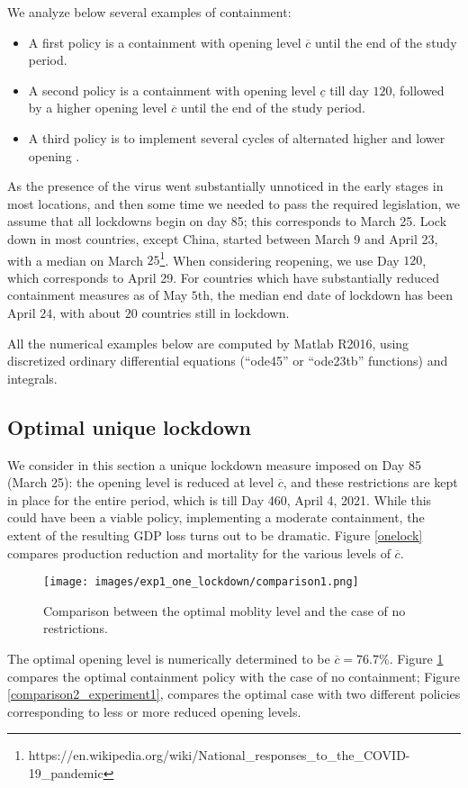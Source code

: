 \documentclass{amsart}
\begin{document}
We analyze below several examples of containment:
 \begin{itemize}
 \item A first policy is a containment with opening level 
 $\overline c$ until the end of the study period.
 \item A second policy is a containment  with opening level  $\underline c$
 till day $120$,  followed by a higher opening level 
 $\overline c$ until the end of the study period.
 \item A third policy is to implement several cycles of alternated higher and lower opening .
 \end{itemize}
 

As the presence of the virus went substantially unnoticed
in the early stages in most locations, and then some
time we needed to pass the required legislation,
we 
assume that all lockdowns begin on day 85; this
corresponds to March 25. Lock down in most countries,
except China,
started between March 9 and April 23, with a median
on March $25$\footnote{https://en.wikipedia.org/wiki/National\_responses\_to\_the\_COVID-19\_pandemic}.
When considering reopening, we use Day $120$,
which corresponds to 
April 29. For countries which have substantially reduced
containment measures as of May $5$th, the median
end date of lockdown has been April $24$, with about $20$
countries still in lockdown.

All the numerical examples below are computed by Matlab R2016, using   discretized ordinary differential equations (``ode45'' or ``ode23tb'' functions) and integrals. 


\subsection{Optimal unique lockdown} \label{SectUniqLock}
We consider in this section a unique lockdown measure
imposed on Day 85 (March 25):
the opening level is reduced at level $\overline c$, and 
these restrictions are kept in place for 
the entire period, which is till Day 460, April 4, 2021.
While this could have been a viable policy,
implementing a moderate containment,
the extent of the resulting 
GDP loss turns out to be dramatic.
Figure \ref{onelock}
compares production reduction and mortality for the 
various levels of $\overline c$.




\begin{figure}[h!]
    \centering
    \texttt{[image: images/exp1\_one\_lockdown/comparison1.png]}
    \caption{Comparison between the optimal moblity level and the case of no restrictions.}
    \label{plot_opt_lockdown}
\end{figure}
The optimal opening level is numerically determined to be 
$\overline c=76.7\%$. Figure \ref{plot_opt_lockdown}
compares the optimal containment policy with the case of 
no containment; Figure
\ref{comparison2_experiment1}, compares the optimal case
with two different policies corresponding to  less or more reduced opening  levels.
\end{document}
